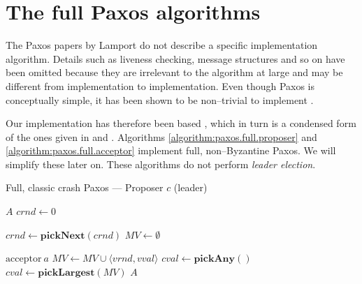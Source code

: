 \section{The full Paxos algorithms}

The Paxos papers by Lamport \cite{Lamport:1998:PP:279227.279229}
\cite{Lam01} do not describe a specific implementation algorithm.
Details such as liveness checking, message structures and so on have
been omitted because they are irrelevant to the algorithm at large and may be
different from implementation to implementation.  Even though Paxos
is conceptually simple, it has been shown to be non--trivial to implement
\cite{Chandra:2007:PML:1281100.1281103}.

Our implementation has therefore been based 
\cite{Insane.Paxos}, which in turn is a condensed form of the ones given in 
\cite{renesse.paxos} and \cite{Lam01}.
%
Algorithms \ref{algorithm:paxos.full.proposer} and
\ref{algorithm:paxos.full.acceptor} implement full, non--Byzantine Paxos.
We will simplify these later on.  These algorithms do not perform \textit{leader
election}.

\begin{algorithm}
  \caption{Full, classic crash Paxos --- Proposer $c$ (leader)}
  \label{algorithm:paxos.full.proposer}
  \begin{algorithmic}

    \State $A$ 
    \State $crnd \gets 0$ 
    \State

      \State $crnd \gets \textbf{pickNext}(crnd)$ 
      \State $MV \gets \emptyset$ 
      \State {}
    \EndOn
    \State

       {$\text{acceptor}\ a$} 
        \State $MV \gets MV \cup \langle vrnd, vval \rangle$
            \State $cval \gets \textbf{pickAny}()$
          \Else
            \State $cval \gets \textbf{pickLargest}(MV)$
          \EndIf
         \State {}
                       {$A$}
        \EndIf
      \EndIf
    \EndOn

  \end{algorithmic}
\end{algorithm}

